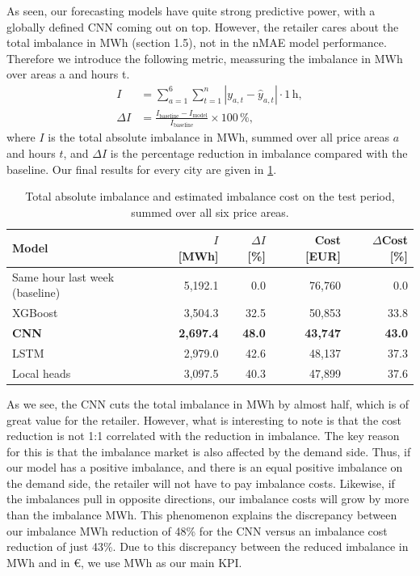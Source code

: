 \documentclass[11pt,a4paper]{article}
\begin{document}
As seen, our forecasting models have quite strong predictive power, with a globally defined CNN coming out on top. However, the retailer cares about the total imbalance in MWh (section 1.5), not in the nMAE model performance. Therefore we introduce the following metric, meassuring the imbalance in MWh over areas a and hours t.
\begin{align}
    I &= \sum_{a=1}^{6}\sum_{t=1}^{n} \left| y_{a,t} - \hat{y}_{a,t} \right| \cdot 1\,\text{h}, \label{eq:imbalance} \\
    \Delta I &= \frac{I_{\text{baseline}} - I_{\text{model}}}{I_{\text{baseline}}} \times 100\,\%, \label{eq:reduction}
\end{align}
where $I$ is the total absolute imbalance in MWh, summed over all price areas $a$ and hours $t$, and $\Delta I$ is the percentage reduction in imbalance compared with the baseline. Our final results for every city are given in \cref{tab:imbalance-cost}.

\begin{table}[H]
\centering
\caption{Total absolute imbalance and estimated imbalance cost on the test period, summed over all six price areas.}
\label{tab:imbalance-cost}
\begin{tabular}{lrrrr}
\toprule
Model & $I$ [MWh] & $\Delta I$ [\%] & Cost [EUR] & $\Delta$Cost [\%] \\
\midrule
Same hour last week (baseline) & 5,192.1 & 0.0  & 76,760 & 0.0 \\
XGBoost                        & 3,504.3 & 32.5 & 50,853 & 33.8 \\
\textbf{CNN}                   & \textbf{2,697.4} & \textbf{48.0} & \textbf{43,747} & \textbf{43.0} \\
LSTM                           & 2,979.0 & 42.6 & 48,137 & 37.3 \\
Local heads                    & 3,097.5 & 40.3 & 47,899 & 37.6 \\
\bottomrule
\end{tabular}
\end{table}

As we see, the CNN cuts the total imbalance in MWh by almost half, which is of great value for the retailer. However, what is interesting to note is that the cost reduction is not 1:1 correlated with the reduction in imbalance. The key reason for this is that the imbalance market is also affected by the demand side. Thus, if our model has a positive imbalance, and there is an equal positive imbalance on the demand side, the retailer will not have to pay imbalance costs. Likewise, if the imbalances pull in opposite directions, our imbalance costs will grow by more than the imbalance MWh. This phenomenon explains the discrepancy between our imbalance MWh reduction of 48\% for the CNN versus an imbalance cost reduction of just 43\%. Due to this discrepancy between the reduced imbalance in MWh and in €, we use MWh as our main KPI.
\end{document}

